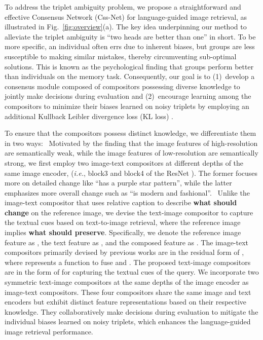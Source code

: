 \documentclass[sigconf]{acmart}
\def\ie{\emph{i.e.}}
\begin{document}
To address the triplet ambiguity problem, we propose a straightforward and effective Consensus Network (Css-Net) for language-guided image retrieval, as illustrated in Fig.~\!\ref{fig:overview}(a). 
The key idea underpinning our method to alleviate the triplet ambiguity is ``two heads are better than one'' in short. To be more specific, an individual often errs due to inherent biases, but groups are less susceptible to making similar mistakes, thereby circumventing sub-optimal solutions. This is known as the psychological finding \cite{hinsz1990cognitive} that groups perform better than individuals on the memory task. Consequently, our goal is to (1)~\!develop a consensus module composed of compositors possessing diverse knowledge to jointly make decisions during evaluation and (2)~\!encourage learning among the compositors to minimize their biases learned on noisy triplets by employing an additional Kullback Leibler divergence loss (KL loss) \cite{kullback1951information}. 

To ensure that the compositors possess distinct knowledge, we differentiate them in two ways: ~Motivated by the finding \cite{lin2017feature,miech2021thinking} that the image features of high-resolution are semantically weak, while the image features of low-resolution are semantically strong, we first employ two image-text compositors at different depths of the same image encoder, (\ie, block3 and block4 of the ResNet \cite{he2016deep}). The former focuses more on detailed change like ``has a purple star pattern'', while the latter emphasizes more overall change such as ``is modern and fashional''. ~Unlike the image-text compositor that uses relative caption to describe \textbf{what should change} on the reference image, we devise the text-image compositor to capture the textual cues based on text-to-image retrieval, where the reference image implies \textbf{what should preserve}. 
Specifically, we denote the reference image feature as , the text feature as , and the composed feature as . The image-text compositors primarily devised by previous works \cite{vo2019composing,chen2020image,lee2021cosmo,wen2021comprehensive} are in the residual form of , where  represents a function to fuse  and . The proposed text-image compositors are in the form of  for capturing the textual cues of the query. We incorporate two symmetric text-image compositors at the same depths of the image encoder as image-text compositors. These four compositors share the same image and text encoders but exhibit distinct feature representations based on their respective knowledge. They collaboratively make decisions during evaluation to mitigate the individual biases learned on noisy triplets, which enhances the language-guided image retrieval performance.
\end{document}
